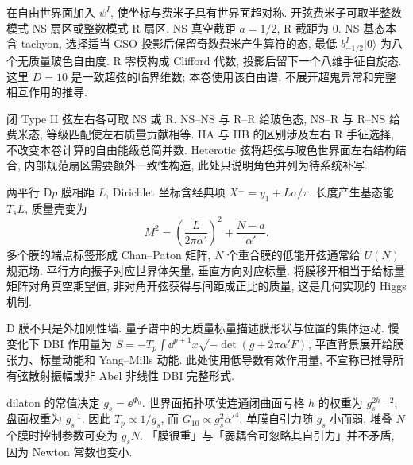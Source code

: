 \label{ch:branes}
在自由世界面加入 $\psi^I$, 使坐标与费米子具有世界面超对称. 开弦费米子可取半整数模式 NS 扇区或整数模式 R 扇区. NS 真空截距 $a=1/2$, R 截距为 0. NS 基态本含 tachyon, 选择适当 GSO 投影后保留奇数费米产生算符的态, 最低 $b^I_{-1/2}|0\rangle$ 为八个无质量玻色自由度. R 零模构成 Clifford 代数, 投影后留下一个八维手征自旋态. 这里 $D=10$ 是一致超弦的临界维数; 本卷使用该自由谱, 不展开超鬼异常和完整相互作用的推导.

闭 Type II 弦左右各可取 NS 或 R. NS--NS 与 R--R 给玻色态, NS--R 与 R--NS 给费米态, 等级匹配使左右质量贡献相等. IIA 与 IIB 的区别涉及左右 R 手征选择, 不改变本卷计算的自由能级总简并数. Heterotic 弦将超弦与玻色世界面左右结构结合, 内部规范扇区需要额外一致性构造, 此处只说明角色并列为待系统补写.

两平行 D$p$ 膜相距 $L$, Dirichlet 坐标含经典项 $X^\perp=y_1+L\sigma/\pi$. 长度产生基态能 $T_sL$, 质量壳变为
\begin{equation}\label{eq:stretch}
M^2=\left(\frac L{2\pi\alpha'}\right)^2+\frac{N-a}{\alpha'}.
\end{equation}
多个膜的端点标签形成 Chan--Paton 矩阵, $N$ 个重合膜的低能开弦通常给 $U(N)$ 规范场. 平行方向振子对应世界体矢量, 垂直方向对应标量. 将膜移开相当于给标量矩阵对角真空期望值, 非对角开弦获得与间距成正比的质量, 这是几何实现的 Higgs 机制.

D 膜不只是外加刚性墙. 量子谱中的无质量标量描述膜形状与位置的集体运动. 慢变化下 DBI 作用量为 $S=-T_p\int\dd^{p+1}x\sqrt{-\det(g+2\pi\alpha'F)}$, 平直背景展开给膜张力、标量动能和 Yang--Mills 动能. 此处使用低导数有效作用量, 不宣称已推导所有弦散射振幅或非 Abel 非线性 DBI 完整形式.

dilaton 的常值决定 $g_s=\ee^{\Phi_0}$. 世界面拓扑项使连通闭曲面亏格 $h$ 的权重为 $g_s^{2h-2}$, 盘面权重为 $g_s^{-1}$. 因此 $T_p\propto1/g_s$, 而 $G_{10}\propto g_s^2\alpha'^4$. 单膜自引力随 $g_s$ 小而弱, 堆叠 $N$ 个膜时控制参数可变为 $g_sN$. 「膜很重」与「弱耦合可忽略其自引力」并不矛盾, 因为 Newton 常数也变小.
